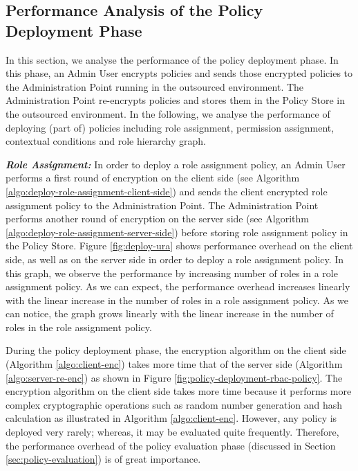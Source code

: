 \documentclass[final,5p,times,twocolumn]{elsarticle}
\begin{document}
\subsection{Performance Analysis of the Policy Deployment Phase}
In this section, we analyse the performance of the policy deployment phase. In this phase, an Admin User encrypts policies and sends those encrypted policies to the Administration Point running in the outsourced environment. The Administration Point re-encrypts policies and stores them in the Policy Store in the outsourced environment. In the following, we analyse the performance of deploying (part of) policies including role assignment, permission assignment, contextual conditions and role hierarchy graph.

\emph{\textbf{Role Assignment:}} 
In order to deploy a role assignment policy, an Admin User performs a first round of encryption on the client side (see Algorithm \ref{algo:deploy-role-assignment-client-side}) and sends the client encrypted role assignment policy to the Administration Point. The Administration Point performs another round of encryption on the server side (see Algorithm \ref{algo:deploy-role-assignment-server-side}) before storing role assignment policy in the Policy Store. Figure \ref{fig:deploy-ura} shows performance overhead on the client side, as well as on the server side in order to deploy a role assignment policy. In this graph, we observe the performance by increasing number of roles in a role assignment policy. As we can expect, the performance overhead increases linearly with the linear increase in the number of roles in a role assignment policy. As we can notice, the graph grows linearly with the linear increase in the number of roles in the role assignment policy.

During the policy deployment phase, the encryption algorithm on the client side (Algorithm \ref{algo:client-enc}) takes more time that of the server side (Algorithm \ref{algo:server-re-enc}) as shown in Figure \ref{fig:policy-deployment-rbac-policy}. The encryption algorithm on the client side takes more time because it performs more complex cryptographic operations such as random number generation and hash calculation as illustrated in Algorithm \ref{algo:client-enc}. However, any policy is deployed very rarely; whereas, it may be evaluated quite frequently. Therefore, the performance overhead of the policy evaluation phase (discussed in Section \ref{sec:policy-evaluation}) is of great importance.
\end{document}
